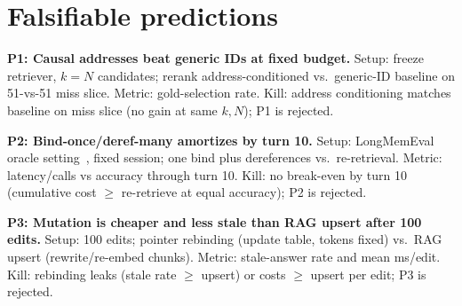 \section{Falsifiable predictions}
\label{sec:predict}

\textbf{P1: Causal addresses beat generic IDs at fixed budget.}
Setup: freeze retriever, $k{=}N$ candidates; rerank address-conditioned vs.\ generic-ID baseline on 51-vs-51 miss slice.
Metric: gold-selection rate.
Kill: address conditioning matches baseline on miss slice (no gain at same $k,N$); P1 is rejected.

\textbf{P2: Bind-once/deref-many amortizes by turn 10.}
Setup: LongMemEval oracle setting~\cite{wu2024longmemeval}, fixed session; one bind plus dereferences vs.\ re-retrieval.
Metric: latency/calls vs accuracy through turn 10.
Kill: no break-even by turn 10 (cumulative cost $\geq$ re-retrieve at equal accuracy); P2 is rejected.

\textbf{P3: Mutation is cheaper and less stale than RAG upsert after 100 edits.}
Setup: 100 edits; pointer rebinding (update table, tokens fixed) vs.\ RAG upsert (rewrite/re-embed chunks).
Metric: stale-answer rate and mean ms/edit.
Kill: rebinding leaks (stale rate $\geq$ upsert) or costs $\geq$ upsert per edit; P3 is rejected.
